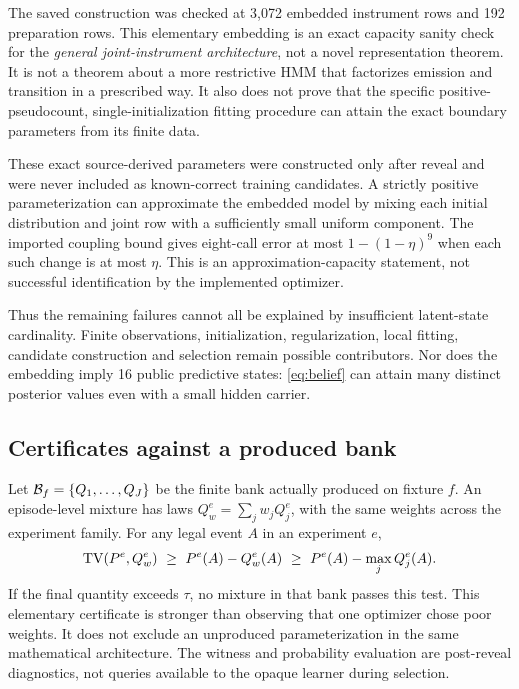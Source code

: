 The saved construction was checked at 3,072 embedded instrument rows and 192 preparation rows. This elementary embedding is an exact capacity sanity check for the \emph{general joint-instrument architecture}, not a novel representation theorem. It is not a theorem about a more restrictive HMM that factorizes emission and transition in a prescribed way. It also does not prove that the specific positive-pseudocount, single-initialization fitting procedure can attain the exact boundary parameters from its finite data.

These exact source-derived parameters were constructed only after reveal and were never included as known-correct training candidates. A strictly positive parameterization can approximate the embedded model by mixing each initial distribution and joint row with a sufficiently small uniform component. The imported coupling bound gives eight-call error at most $1-(1-\eta)^9$ when each such change is at most $\eta$. This is an approximation-capacity statement, not successful identification by the implemented optimizer.

Thus the remaining failures cannot all be explained by insufficient latent-state cardinality. Finite observations, initialization, regularization, local fitting, candidate construction and selection remain possible contributors. Nor does the embedding imply 16 public predictive states: \cref{eq:belief} can attain many distinct posterior values even with a small hidden carrier.

\subsection{Certificates against a produced bank}\label{p3:c07}
Let $\mathcal B_f=\{Q_1,\ldots,Q_J\}$ be the finite bank actually produced on fixture $f$. An episode-level mixture has laws $Q_w^e=\sum_jw_jQ_j^e$, with the same weights across the experiment family. For any legal event $A$ in an experiment $e$,
\begin{equation}
 \operatorname{TV}(P^e,Q_w^e)\ \geq\ P^e(A)-Q_w^e(A)
 \ \geq\ P^e(A)-\max_jQ_j^e(A).
 \label{eq:bank-witness}
\end{equation}
If the final quantity exceeds $\tau$, no mixture in that bank passes this test. This elementary certificate is stronger than observing that one optimizer chose poor weights. It does not exclude an unproduced parameterization in the same mathematical architecture. The witness and probability evaluation are post-reveal diagnostics, not queries available to the opaque learner during selection.


